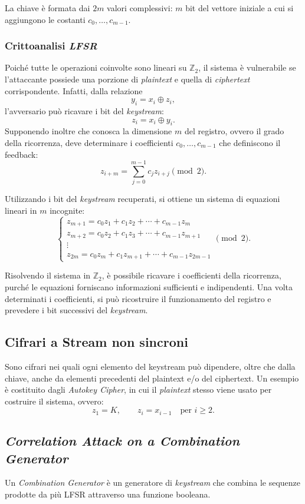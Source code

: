 \noindent La chiave è formata dai $2m$ valori complessivi: $m$ bit del vettore iniziale a cui si aggiungono le costanti $c_0, \dots, c_{m-1}$. 

\subsubsection{Crittoanalisi \textit{LFSR}} Poiché tutte le operazioni coinvolte sono lineari su \(\mathbb{Z}_2\), il sistema è vulnerabile se l'attaccante possiede una porzione di \textit{plaintext} e quella di \textit{ciphertext} corrispondente. Infatti, dalla relazione
\[
y_i=x_i\oplus z_i,
\]
l'avversario può ricavare i bit del \textit{keystream}:
\[
z_i=x_i\oplus y_i.
\]
Supponendo inoltre che conosca la dimensione \(m\) del registro,
ovvero il grado della ricorrenza, deve determinare i coefficienti
\(c_0,\ldots,c_{m-1}\) che definiscono il feedback:
\[
z_{i+m}=\sum_{j=0}^{m-1}c_jz_{i+j}\pmod 2.
\]

\noindent Utilizzando i bit del \textit{keystream} recuperati, si ottiene
un sistema di equazioni lineari in \(m\) incognite:
\[
\begin{cases}
z_{m+1}=c_0z_1+c_1z_2+\cdots+c_{m-1}z_m\\
z_{m+2}=c_0z_2+c_1z_3+\cdots+c_{m-1}z_{m+1}\\
\vdots\\
z_{2m}=c_0z_m+c_1z_{m+1}+\cdots+c_{m-1}z_{2m-1}
\end{cases}
\pmod 2.
\]

\noindent Risolvendo il sistema in \(\mathbb{Z}_2\), è possibile ricavare
i coefficienti della ricorrenza, purché le equazioni forniscano
informazioni sufficienti e indipendenti. Una volta determinati
i coefficienti, si può ricostruire il funzionamento del registro
e prevedere i bit successivi del \textit{keystream}.

\subsection{Cifrari a Stream non sincroni}
Sono cifrari nei quali ogni elemento del keystream può dipendere, oltre che dalla chiave, anche da elementi precedenti del plaintext e/o del ciphertext. Un esempio è costituito dagli \textit{Autokey Cipher}, in cui il \textit{plaintext} stesso viene usato per costruire il sistema, ovvero:
\[
z_1=K,\qquad z_i=x_{i-1}\quad\text{per }i\geq 2.
\]

\newpage
\subsection{\textit{Correlation Attack on a Combination Generator}}
Un \textit{Combination Generator} è un generatore di \textit{keystream} che combina le sequenze prodotte da più LFSR attraverso una funzione booleana. 

